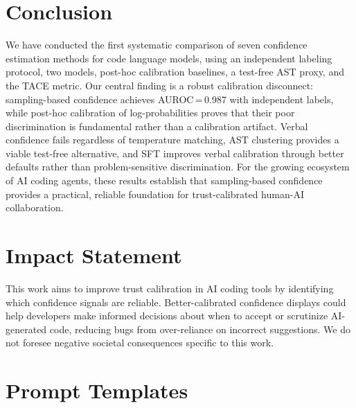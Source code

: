 \documentclass{article}
\begin{document}
\section{Conclusion}
\label{sec:conclusion}

We have conducted the first systematic comparison of seven confidence estimation methods for code language models, using an independent labeling protocol, two models, post-hoc calibration baselines, a test-free AST proxy, and the TACE metric. Our central finding is a robust calibration disconnect: sampling-based confidence achieves AUROC\,=\,0.987 with independent labels, while post-hoc calibration of log-probabilities proves that their poor discrimination is fundamental rather than a calibration artifact. Verbal confidence fails regardless of temperature matching, AST clustering provides a viable test-free alternative, and SFT improves verbal calibration through better defaults rather than problem-sensitive discrimination. For the growing ecosystem of AI coding agents, these results establish that sampling-based confidence provides a practical, reliable foundation for trust-calibrated human-AI collaboration.

\section*{Impact Statement}
This work aims to improve trust calibration in AI coding tools by identifying which confidence signals are reliable. Better-calibrated confidence displays could help developers make informed decisions about when to accept or scrutinize AI-generated code, reducing bugs from over-reliance on incorrect suggestions. We do not foresee negative societal consequences specific to this work.




\newpage
\appendix
\section{Prompt Templates}
\label{app:prompts}
\end{document}
